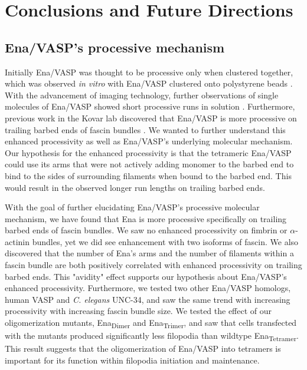 
\chapter{Conclusions and Future Directions}\label{ch:conclusions}

\section{Ena/VASP's processive mechanism}\label{ena-mechanism-conclusions}
Initially Ena/VASP was thought to be processive only when clustered together, which was observed \textit{in vitro} with Ena/VASP clustered onto polystyrene beads \citep{breitsprecher_clustering_2008}. With the advancement of imaging technology, further observations of single molecules of Ena/VASP showed short processive runs in solution \citep{hansen_vasp_2010}. Furthermore, previous work in the Kovar lab discovered that Ena/VASP is more processive on trailing barbed ends of fascin bundles \citep{winkelman_ena/vasp_2014}. We wanted to further understand this enhanced processivity as well as Ena/VASP's underlying molecular mechanism. Our hypothesis for the enhanced processivity is that the tetrameric Ena/VASP could use its arms that were not actively adding monomer to the barbed end to bind to the sides of surrounding filaments when bound to the barbed end. This would result in the observed longer run lengths on trailing barbed ends.

With the goal of further elucidating Ena/VASP's processive molecular mechanism, we have found that Ena is more processive specifically on trailing barbed ends of fascin bundles. We saw no enhanced processivity on fimbrin or $\alpha$-actinin bundles, yet we did see enhancement with two isoforms of fascin. We also discovered that the number of Ena's arms and the number of filaments within a fascin bundle are both positively correlated with enhanced processivity on trailing barbed ends. This "avidity" effect supports our hypothesis about Ena/VASP's enhanced processivity. Furthermore, we tested two other Ena/VASP homologs, human VASP and \textit{C. elegans} UNC-34, and saw the same trend with increasing processivity with increasing fascin bundle size. We tested the effect of our oligomerization mutants, Ena\textsubscript{Dimer} and Ena\textsubscript{Trimer}, and saw that cells transfected with the mutants produced significantly less filopodia than wildtype Ena\textsubscript{Tetramer}. This result suggests that the oligomerization of Ena/VASP into tetramers is important for its function within filopodia initiation and maintenance.

